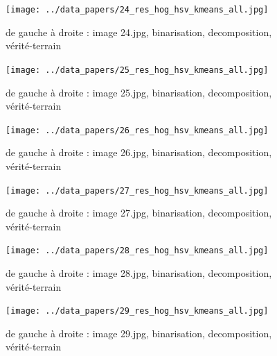 \documentclass{book}
\begin{document}
\begin{figure}[H]
\begin{center}
\texttt{[image: ../data\_papers/24\_res\_hog\_hsv\_kmeans\_all.jpg]}
\end{center}
\caption{de gauche à droite : image 24.jpg, binarisation, decomposition, vérité-terrain}
\label{24}
\end{figure}
\clearpage


\begin{figure}[H]
\begin{center}
\texttt{[image: ../data\_papers/25\_res\_hog\_hsv\_kmeans\_all.jpg]}
\end{center}
\caption{de gauche à droite : image 25.jpg, binarisation, decomposition, vérité-terrain}
\label{25}
\end{figure}
\clearpage


\begin{figure}[H]
\begin{center}
\texttt{[image: ../data\_papers/26\_res\_hog\_hsv\_kmeans\_all.jpg]}
\end{center}
\caption{de gauche à droite : image 26.jpg, binarisation, decomposition, vérité-terrain}
\label{26}
\end{figure}
\clearpage


\begin{figure}[H]
\begin{center}
\texttt{[image: ../data\_papers/27\_res\_hog\_hsv\_kmeans\_all.jpg]}
\end{center}
\caption{de gauche à droite : image 27.jpg, binarisation, decomposition, vérité-terrain}
\label{27}
\end{figure}
\clearpage


\begin{figure}[H]
\begin{center}
\texttt{[image: ../data\_papers/28\_res\_hog\_hsv\_kmeans\_all.jpg]}
\end{center}
\caption{de gauche à droite : image 28.jpg, binarisation, decomposition, vérité-terrain}
\label{28}
\end{figure}
\clearpage


\begin{figure}[H]
\begin{center}
\texttt{[image: ../data\_papers/29\_res\_hog\_hsv\_kmeans\_all.jpg]}
\end{center}
\caption{de gauche à droite : image 29.jpg, binarisation, decomposition, vérité-terrain}
\label{29}
\end{figure}
\clearpage
\end{document}
